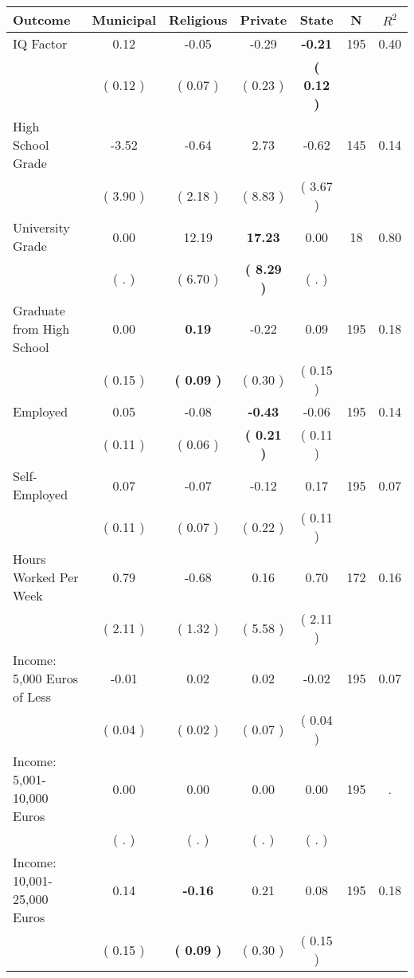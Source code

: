 \begin{tabular}{lcccccc}
\toprule
 \textbf{Outcome} & \textbf{Municipal} & \textbf{Religious} & \textbf{Private} & \textbf{State} & \textbf{N} & \textbf{$ R^2$} \\
\midrule
IQ Factor &      0.12 &     -0.05 &     -0.29 & \textbf{    -0.21} & 195 &      0.40 \\ 
 & (     0.12 ) & (     0.07 ) & (     0.23 ) & \textbf{(     0.12 )} & \\
High School Grade &     -3.52 &     -0.64 &      2.73 &     -0.62 & 145 &      0.14 \\ 
 & (     3.90 ) & (     2.18 ) & (     8.83 ) & (     3.67 ) & \\
University Grade &      0.00 &     12.19 & \textbf{    17.23} &      0.00 & 18 &      0.80 \\ 
 & (        . ) & (     6.70 ) & \textbf{(     8.29 )} & (        . ) & \\
Graduate from High School &      0.00 & \textbf{     0.19} &     -0.22 &      0.09 & 195 &      0.18 \\ 
 & (     0.15 ) & \textbf{(     0.09 )} & (     0.30 ) & (     0.15 ) & \\
Employed &      0.05 &     -0.08 & \textbf{    -0.43} &     -0.06 & 195 &      0.14 \\ 
 & (     0.11 ) & (     0.06 ) & \textbf{(     0.21 )} & (     0.11 ) & \\
Self-Employed &      0.07 &     -0.07 &     -0.12 &      0.17 & 195 &      0.07 \\ 
 & (     0.11 ) & (     0.07 ) & (     0.22 ) & (     0.11 ) & \\
Hours Worked Per Week &      0.79 &     -0.68 &      0.16 &      0.70 & 172 &      0.16 \\ 
 & (     2.11 ) & (     1.32 ) & (     5.58 ) & (     2.11 ) & \\
Income: 5,000 Euros of Less &     -0.01 &      0.02 &      0.02 &     -0.02 & 195 &      0.07 \\ 
 & (     0.04 ) & (     0.02 ) & (     0.07 ) & (     0.04 ) & \\
Income: 5,001-10,000 Euros &      0.00 &      0.00 &      0.00 &      0.00 & 195 &         . \\ 
 & (        . ) & (        . ) & (        . ) & (        . ) & \\
Income: 10,001-25,000 Euros &      0.14 & \textbf{    -0.16} &      0.21 &      0.08 & 195 &      0.18 \\ 
 & (     0.15 ) & \textbf{(     0.09 )} & (     0.30 ) & (     0.15 ) & \\

\end{tabular}
